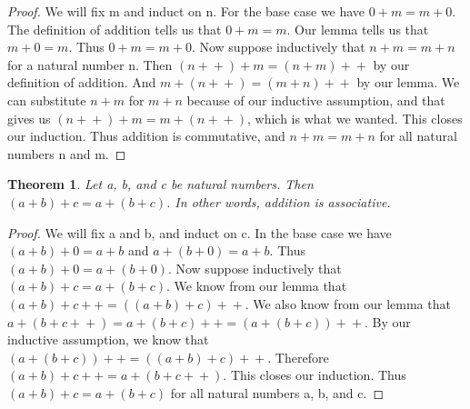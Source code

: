 \documentclass{article}
\newtheorem{theorem}{Theorem}
\newcommand{\inc}[1]{#1\!+\!+}
\newcommand{\incp}[1]{(#1\!+\!+)}
\begin{document}
\begin{proof}
We will fix m and induct on n. For the base case we have $0 + m = m + 0$. The definition of addition tells us that $0 + m = m$. Our lemma tells us that $m + 0 = m$. Thus $0 + m = m + 0$. Now suppose inductively that $n + m = m + n$ for a natural number n. Then $\incp{n} + m = \inc{(n+m)}$ by our definition of addition. And $m + \incp{n} = \inc{(m + n)}$ by our lemma. We can substitute $n + m$ for $m + n$ because of our inductive assumption, and that gives us $\incp{n} + m = m + \incp{n}$, which is what we wanted. This closes our induction. Thus addition is commutative, and $n + m = m + n$ for all natural numbers n and m.
\end{proof}

\begin{theorem}
Let a, b, and c be natural numbers. Then $(a + b) + c = a + (b + c)$. In other words, addition is associative.
\end{theorem}

\begin{proof}
We will fix a and b, and induct on c. In the base case we have $(a + b) + 0 = a + b$ and $a + (b + 0) = a + b$. Thus $(a + b) + 0 = a + (b + 0)$. Now suppose inductively that $(a + b) + c = a + (b + c)$. We know from our lemma that $(a + b) + \inc{c} = \inc{((a + b) + c)}$. We also know from our lemma that $a + (b + \inc{c}) = a + \inc{(b + c)} = \inc{(a + (b + c))}$. By our inductive assumption, we know that $\inc{(a + (b + c))} = \inc{((a + b) + c)}$. Therefore $(a + b) + \inc{c} = a + (b + \inc{c})$. This closes our induction. Thus $(a + b) + c = a + (b + c)$ for all natural numbers a, b, and c.
\end{proof}
\end{document}
